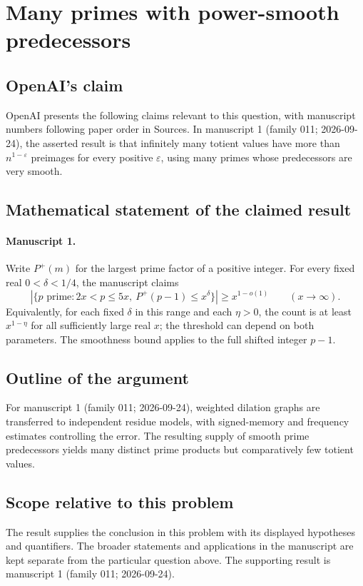 \documentclass[11pt]{article}
\begin{document}
\section*{Many primes with power-smooth predecessors}

\subsection{OpenAI's claim}
OpenAI presents the following claims relevant to this question, with manuscript numbers following paper order in Sources. In manuscript 1 (family 011; 2026-09-24), the asserted result is that infinitely many totient values have more than $n^{1-\varepsilon}$ preimages for every positive $\varepsilon$, using many primes whose predecessors are very smooth.

\subsection{Mathematical statement of the claimed result}
\paragraph{Manuscript 1.}
Write $P^+(m)$ for the largest prime factor of a positive integer. For every fixed real $0<\delta<1/4$, the manuscript claims
\[
 |\{p\text{ prime}:2x<p\le5x,\ P^+(p-1)\le x^{\delta}\}|
 \ge x^{1-o(1)}\qquad(x\to\infty).
\]
Equivalently, for each fixed $\delta$ in this range and each $\eta>0$, the count is at least $x^{1-\eta}$ for all sufficiently large real $x$; the threshold can depend on both parameters. The smoothness bound applies to the full shifted integer $p-1$.

\subsection{Outline of the argument}
For manuscript 1 (family 011; 2026-09-24), weighted dilation graphs are transferred to independent residue models, with signed-memory and frequency estimates controlling the error. The resulting supply of smooth prime predecessors yields many distinct prime products but comparatively few totient values.

\subsection{Scope relative to this problem}
The result supplies the conclusion in this problem with its displayed hypotheses and quantifiers. The broader statements and applications in the manuscript are kept separate from the particular question above. The supporting result is manuscript 1 (family 011; 2026-09-24).
\end{document}
